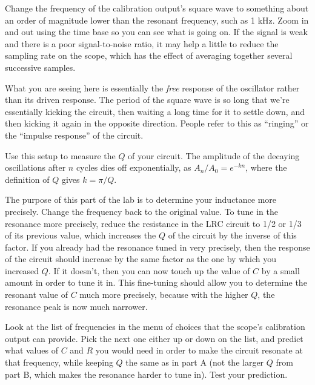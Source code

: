 Change the frequency of the calibration output's square wave to something about an order
of magnitude lower than the resonant frequency, such as 1 kHz. Zoom in and out using the
time base so you can see what is going on. If the signal is weak and there is a poor signal-to-noise
ratio, it may help a little to reduce the sampling rate on the scope, which has the effect
of averaging together several successive samples.

What you are seeing here is essentially the
\emph{free} response of the oscillator rather than its driven response. The period of the square wave is
so long that we're essentially kicking the circuit, then waiting a long time for it to settle down,
and then kicking it again in the opposite direction. People refer to this as ``ringing''
or the ``impulse response'' of the circuit.


Use this setup to measure the $Q$ of your circuit. The amplitude of the decaying oscillations
after $n$ cycles dies off exponentially, as $A_n/A_0=e^{-kn}$, where the definition of $Q$
gives $k=\pi/Q$.


The purpose of this part of the lab is to determine your inductance more precisely.
Change the frequency back to the original value.
To tune in the resonance more precisely, reduce the resistance
in the LRC circuit to 1/2 or 1/3 of its previous value, which increases
the $Q$ of the circuit by the inverse of this factor. If you already had the resonance
tuned in very precisely, then the response of the circuit should increase by the
same factor as the one by which you increased $Q$. If it doesn't, then you can now
touch up the value of $C$ by a small amount in order to tune it in. This fine-tuning
should allow you to determine the resonant value of $C$ much more precisely, because
with the higher $Q$, the resonance peak is now much narrower.


Look at the list of frequencies in the menu of choices that the scope's calibration
output can provide. Pick the next one either up or down on the list, and predict what
values of $C$ and $R$ you would need in order to make the circuit resonate at that frequency,
while keeping $Q$ the same as in part A (not the larger $Q$ from part B, which makes the
resonance harder to tune in).
Test your prediction.

